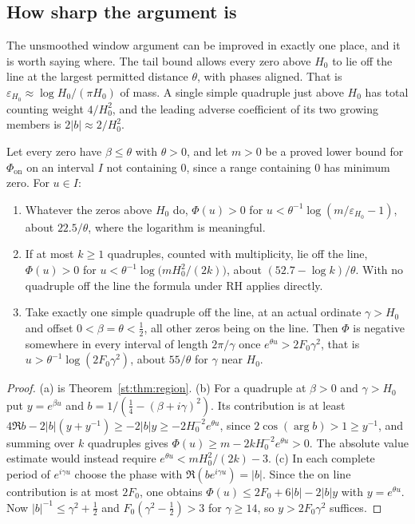 \subsection{How sharp the argument is}
The unsmoothed window argument can be improved in exactly one place, and it is worth saying where. The tail bound allows every zero above $H_0$ to lie off the line at the largest permitted distance $\theta$, with phases aligned. That is $\varepsilon_{H_0}\approx\log H_0/(\pi H_0)$ of mass. A single simple quadruple just above $H_0$ has total counting weight $4/H_0^2$, and the leading adverse coefficient of its two growing members is $2|b|\approx2/H_0^2$.
\begin{proposition}\label{st:prop:sharp}
Let every zero have $\beta\le\theta$ with $\theta>0$, and let $m>0$ be a proved lower bound for $\Phi_{\mathrm{on}}$ on an interval $I$ not containing $0$, since a range containing $0$ has minimum zero. For $u\in I$:
\begin{enumerate}
\item[(a)] Whatever the zeros above $H_0$ do, $\Phi(u)>0$ for $u<\theta^{-1}\log(m/\varepsilon_{H_0}-1)$, about $22.5/\theta$, where the logarithm is meaningful.
\item[(b)] If at most $k\ge1$ quadruples, counted with multiplicity, lie off the line, $\Phi(u)>0$ for $u<\theta^{-1}\log\big(mH_0^2/(2k)\big)$, about $(52.7-\log k)/\theta$. With no quadruple off the line the formula under RH applies directly.
\item[(c)] Take exactly one simple quadruple off the line, at an actual ordinate $\gamma>H_0$ and offset $0<\beta=\theta<\tfrac12$, all other zeros being on the line. Then $\Phi$ is negative somewhere in every interval of length $2\pi/\gamma$ once $e^{\theta u}>2F_0\gamma^2$, that is $u>\theta^{-1}\log(2F_0\gamma^2)$, about $55/\theta$ for $\gamma$ near $H_0$.
\end{enumerate}
\end{proposition}
\begin{proof}
(a) is Theorem~\ref{st:thm:region}. (b) For a quadruple at $\beta>0$ and $\gamma>H_0$ put $y=e^{\beta u}$ and $b=1/(\tfrac14-(\beta+i\gamma)^2)$. Its contribution is at least $4\Re b-2|b|(y+y^{-1})\ge-2|b|y\ge-2H_0^{-2}e^{\theta u}$, since $2\cos(\arg b)>1\ge y^{-1}$, and summing over $k$ quadruples gives $\Phi(u)\ge m-2kH_0^{-2}e^{\theta u}>0$. The absolute value estimate would instead require $e^{\theta u}<mH_0^2/(2k)-3$. (c) In each complete period of $e^{i\gamma u}$ choose the phase with $\Re(be^{i\gamma u})=|b|$. Since the on line contribution is at most $2F_0$, one obtains $\Phi(u)\le2F_0+6|b|-2|b|y$ with $y=e^{\theta u}$. Now $|b|^{-1}\le\gamma^2+\tfrac12$ and $F_0(\gamma^2-\tfrac12)>3$ for $\gamma\ge14$, so $y>2F_0\gamma^2$ suffices.
\end{proof}
